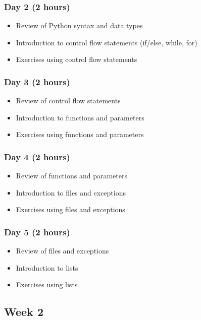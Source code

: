 \documentclass[11pt]{article}
\begin{document}
\subsubsection*{Day 2 (2 hours)}
\label{sec:orgb986486}

\begin{itemize}
\item Review of Python syntax and data types
\item Introduction to control flow statements (if/else, while, for)
\item Exercises using control flow statements
\end{itemize}
\subsubsection*{Day 3 (2 hours)}
\label{sec:orga9347f7}

\begin{itemize}
\item Review of control flow statements
\item Introduction to functions and parameters
\item Exercises using functions and parameters
\end{itemize}
\subsubsection*{Day 4 (2 hours)}
\label{sec:orga59e974}

\begin{itemize}
\item Review of functions and parameters
\item Introduction to files and exceptions
\item Exercises using files and exceptions
\end{itemize}

\subsubsection*{Day 5 (2 hours)}
\label{sec:org9f61970}

\begin{itemize}
\item Review of files and exceptions
\item Introduction to lists
\item Exercises using lists
\end{itemize}
\subsection*{Week 2}
\label{sec:orgc87d66d}
\end{document}
